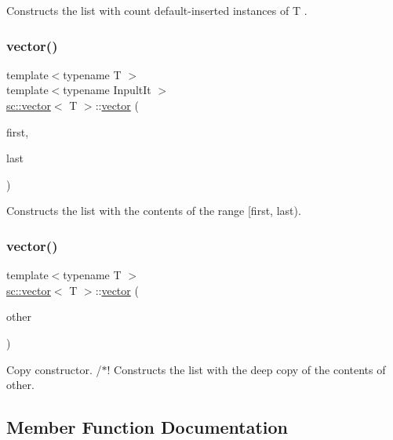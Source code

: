 Constructs the list with count default-\/inserted instances of T . \mbox{\label{classsc_1_1vector_ae8d5902ac778d0ec063f76dce01cd150}} 
\subsubsection{\texorpdfstring{vector()}{vector()}\hspace{0.1cm}{\footnotesize\ttfamily [4/5]}}
{\footnotesize\ttfamily template$<$typename T $>$ \\
template$<$typename Inpult\+It $>$ \\
\hyperlink{classsc_1_1vector}{sc\+::vector}$<$ T $>$\+::\hyperlink{classsc_1_1vector}{vector} (\begin{DoxyParamCaption}\item[{Inpult\+It}]{first,  }\item[{Inpult\+It}]{last }\end{DoxyParamCaption})\hspace{0.3cm}{\ttfamily [inline]}}

Constructs the list with the contents of the range \mbox{[}first, last). \mbox{\label{classsc_1_1vector_aed6fb1e650e0256b483ce754a473c4c2}} 
\subsubsection{\texorpdfstring{vector()}{vector()}\hspace{0.1cm}{\footnotesize\ttfamily [5/5]}}
{\footnotesize\ttfamily template$<$typename T $>$ \\
\hyperlink{classsc_1_1vector}{sc\+::vector}$<$ T $>$\+::\hyperlink{classsc_1_1vector}{vector} (\begin{DoxyParamCaption}\item[{const \hyperlink{classsc_1_1vector}{vector}$<$ T $>$ \&}]{other }\end{DoxyParamCaption})\hspace{0.3cm}{\ttfamily [inline]}}

Copy constructor. /$\ast$! Constructs the list with the deep copy of the contents of other. 

\subsection{Member Function Documentation}
\mbox{\label{classsc_1_1vector_aaa1279dfc147a016a70a65faa7d89c23}} 
